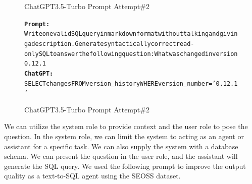 \begin{figure}[H]
    \begin{AIbox}{ChatGPT3.5-Turbo Prompt Attempt\#2}
        \vspace{-5px}
        \parbox{1\textwidth}{\scriptsize
            \begin{alltt} \larger
                {\bf Prompt:} \\
                Write one valid SQL query in markdown format without talking and giving a description. Generate syntactically correct read-only SQL to answer the following question: What was changed in version 0.12.1
                \\
                {\bf ChatGPT:} \\
                SELECT changes FROM version\_history WHERE version\_number = '0.12.1'
            \end{alltt}
        }
        \vspace{-5px}
    \end{AIbox}

    \caption{ChatGPT3.5-Turbo Prompt Attempt\#2}
\end{figure}

We can utilize the system role to provide context and the user role to pose the question. In the system role, we can limit the system to acting as an agent or assistant for a specific task. We can also supply the system with a database schema. We can present the question in the user role, and the assistant will generate the SQL query. We used the following prompt to improve the output quality as a text-to-SQL agent using the SEOSS dataset.

